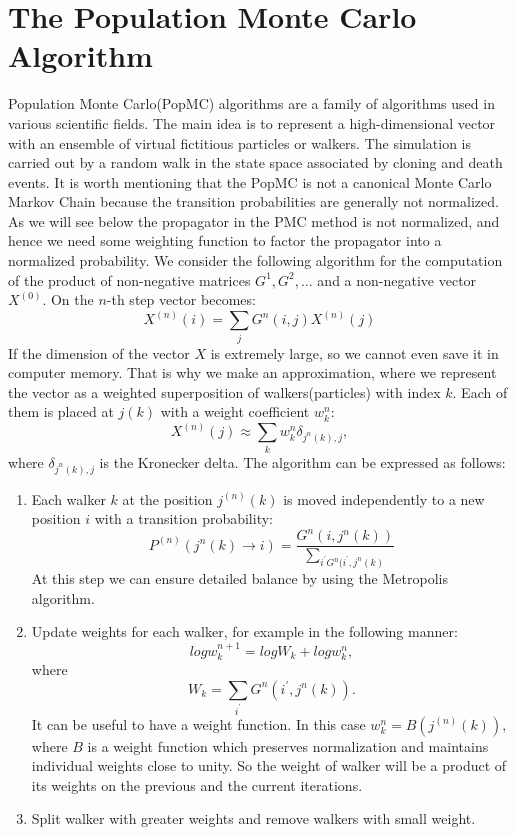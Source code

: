 \documentclass[twoside,english]{uiofysmaster}
\begin{document}
\section{The Population Monte Carlo Algorithm}
Population Monte Carlo(PopMC) algorithms are a family of algorithms
used in various scientific fields. The main idea is to represent a
high-dimensional vector with an ensemble of virtual fictitious
particles or walkers. The simulation is carried out by a random walk
in the state space associated by cloning and death events. It is worth
mentioning that the PopMC is not a canonical Monte Carlo Markov Chain
because the transition probabilities are generally not normalized. As
we will see below the propagator in the PMC method is not normalized,
and hence we need some weighting function to factor the propagator
into a normalized probability.  We consider the following algorithm for the
computation of the product of non-negative matrices $G^1, G^2, \dots$
and a non-negative vector $X^{(0)}$. On the $n$-th step vector
becomes:
\begin{equation}
X^{(n)}(i) = \sum_{j} G^n(i,j)X^{(n)}(j)
\end{equation}
If the dimension of the vector $X$ is extremely large, so we cannot even save it in computer memory. That is why we make an approximation, where we represent the vector as a weighted superposition of walkers(particles) with index $k$. Each of them is placed at $j(k)$ with a weight coefficient $w_k^n$:
\begin{equation}
X^{(n)}(j) \approx \sum_{k} w_k^n \delta_{j^n(k),j},
\end{equation}
where $\delta_{j^n(k),j}$ is the Kronecker delta. The algorithm can be expressed as follows:  
\begin{enumerate}
	
	\item 
	Each walker $k$ at the position $j^{(n)}(k)$ is moved independently to a new position $i$ with a transition probability:
	\begin{equation}
	P^{(n)}(j^n(k) \rightarrow i) = \frac{G^n(i, j^n(k))}{\sum_{i^\prime G^n(i^\prime, j^n(k)}}
	\end{equation}
	At this step we can ensure detailed balance by using the Metropolis algorithm.
	\item
	Update weights for each walker, for example in the following manner:
	\begin{equation}
	log w^{n+1}_k = log W_k + log w_k^n,
	\end{equation}
	where
	\begin{equation}
	W_k = \sum_{i^\prime} G^n(i^\prime, j^n(k)).
	\end{equation} 
	It can be useful to have a weight function. In this case $w_k^n = B(j^{(n)}(k))$, where $B$ is a weight function which preserves normalization and maintains individual weights close to unity. So the weight of walker will be a product of its weights on the previous and the current iterations.
	\item
	Split walker with greater weights and remove walkers with small weight.
\end{enumerate}	
\end{document}
